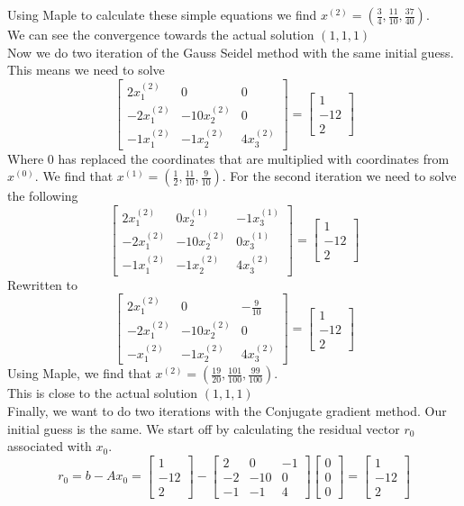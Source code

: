 \documentclass[12pt]{article}
\begin{document}
Using Maple to calculate these simple equations we find $x^{(2)}=(\frac{3}{4},\frac{11}{10},\frac{37}{40})$.\\
We can see the convergence towards the actual solution $(1,1,1)$
\\
Now we do two iteration of the Gauss Seidel method with the same initial guess. This means we need to solve
$$  
\begin{bmatrix}
2x_1^{(2)} & 0 & 0 \\
-2x_1^{(2)} & -10x_2^{(2)} & 0 \\
-1x_1^{(2)} & -1x_2^{(2)} & 4x_3^{(2)}
\end{bmatrix}
=
\begin{bmatrix}
1 \\
-12 \\
2
\end{bmatrix}
$$
Where $0$ has replaced the coordinates that are multiplied with coordinates from $x^{(0)}$. We find that $x^{(1)}=(\frac{1}{2},\frac{11}{10},\frac{9}{10})$. For the second iteration we need to solve the following
$$
\begin{bmatrix}
2x_1^{(2)} & 0x_2^{(1)} & -1x_3^{(1)} \\
-2x_1^{(2)} & -10x_2^{(2)} & 0x_3^{(1)} \\
-1x_1^{(2)} & -1x_2^{(2)} & 4x_3^{(2)}
\end{bmatrix}
=
\begin{bmatrix}
1 \\
-12 \\
2
\end{bmatrix}
$$
Rewritten to
$$
\begin{bmatrix}
2x_1^{(2)} & 0 & -\frac{9}{10} \\
-2x_1^{(2)} & -10x_2^{(2)} & 0 \\
-x_1^{(2)} & -1x_2^{(2)} & 4x_3^{(2)}
\end{bmatrix}
=
\begin{bmatrix}
1 \\
-12 \\
2
\end{bmatrix}
$$
Using Maple, we find that $x^{(2)}=(\frac{19}{20},\frac{101}{100},\frac{99}{100})$.\\
This is close to the actual solution $(1,1,1)$
\\
Finally, we want to do two iterations with the Conjugate gradient method. Our initial guess is the same. We start off by calculating the residual vector $r_0$ associated with $x_0$.
$$
r_0
=
b-Ax_0
=
\begin{bmatrix}
1 \\
-12 \\
2
\end{bmatrix}
-
\begin{bmatrix}
2 & 0 & -1 \\
-2 & -10 & 0 \\
-1 & -1 & 4
\end{bmatrix}
\begin{bmatrix}
0 \\
0 \\
0
\end{bmatrix}
=
\begin{bmatrix}
1 \\
-12 \\
2
\end{bmatrix}
$$
\end{document}
